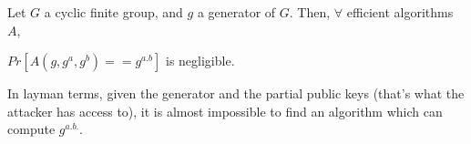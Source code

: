 \begin{mytheorem}
Let $G$ a cyclic finite group, and $g$ a generator of $G$.
Then, $\forall$ efficient algorithms $A$,
\begin{flushright}
	$Pr[ A(g,g^a,g^{b}) == g^{a.b} ]$ is negligible.
\end{flushright} 
\end{mytheorem}
 
 In layman terms, given the generator and the partial public keys (that's what the attacker has access to), it is almost impossible to find an algorithm which can compute $g^{a.b.}$.

